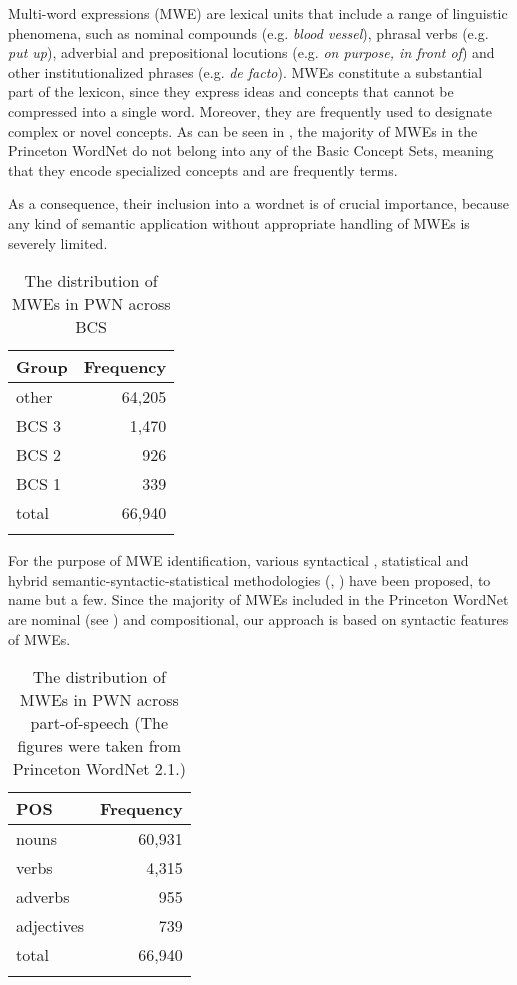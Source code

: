 \documentclass[output=paper]{LSP/langsci}
\begin{document}
Multi-word expressions (MWE) are lexical units that include a range of linguistic phenomena, such as nominal compounds (e.g. \textit{blood vessel}), phrasal verbs (e.g. \textit{put up}), adverbial and prepositional locutions (e.g. \textit{on purpose, in front of}) and other institutionalized phrases (e.g. \textit{de facto}). MWEs constitute a substantial part of the lexicon, since they express ideas and concepts that cannot be compressed into a single word. Moreover, they are frequently used to designate complex or novel concepts. As can be seen in , the majority of MWEs in the Princeton WordNet do not belong into any of the Basic Concept Sets, meaning that they encode specialized concepts and are frequently terms.

As a consequence, their inclusion into a wordnet is of crucial importance, because any kind of semantic application without appropriate handling of MWEs is severely limited.

\begin{table}
\begin{tabular}{lr}
\lsptoprule
{\bfseries Group } & \bfseries Frequency \\
\midrule
other & 64,205 \\
BCS 3 & 1,470 \\
BCS 2 & 926 \\
BCS 1 & 339 \\
total & 66,940 \\
\lspbottomrule
\end{tabular}
\caption{The distribution of MWEs in PWN across BCS}
\label{tab:vintar:1}
\end{table}


\newpage
For the purpose of MWE identification, various syntactical \citep{Bourigault1993}, statistical \citep{Tomokiyo2003} and hybrid semantic-syntactic-statistical methodologies (\citealt{PiaoEtAl2003}, \citealt{Dias2004}) have been proposed, to name but a few. Since the majority of MWEs included in the Princeton WordNet are nominal (see ) and compositional, our approach is based on syntactic features of MWEs. 

\begin{table}
\begin{tabular}{lr}
\lsptoprule
{\bfseries POS } & \bfseries Frequency \\
\midrule
nouns & 60,931 \\
verbs & 4,315 \\
adverbs & 955 \\
adjectives & 739 \\
total & 66,940 \\
\lspbottomrule
\end{tabular}
\caption{The distribution of MWEs in PWN across part-of-speech (The figures were taken from Princeton WordNet 2.1.)}
\label{tab:vintar:2}
\end{table}
\end{document}
